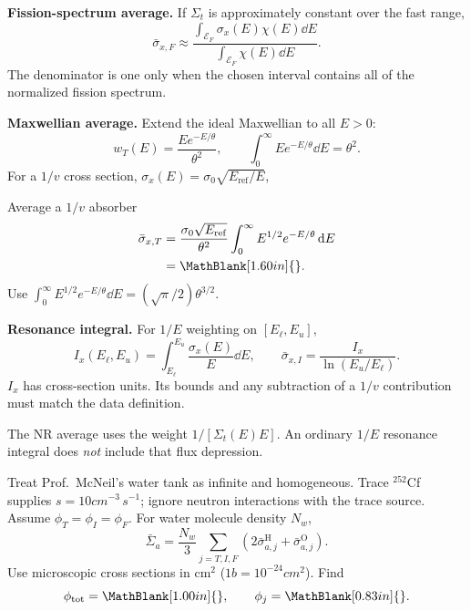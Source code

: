 \newpage
\begin{handoutcolumns}
\textbf{Fission-spectrum average.}
If $\Sigma_t$ is approximately constant over the fast range,
\[
 \bar\sigma_{x,F}\approx
 \frac{\int_{\mathcal E_F}\sigma_x(E)\chi(E)\dd E}
      {\int_{\mathcal E_F}\chi(E)\dd E}.
\]
The denominator is one only when the chosen interval contains
all of the normalized fission spectrum.

\textbf{Maxwellian average.}
Extend the ideal Maxwellian to all $E>0$:
\[
 w_T(E)=\frac{E e^{-E/\theta}}{\theta^2},
 \qquad \int_0^\infty E e^{-E/\theta}\dd E=\theta^2.
\]
For a $1/v$ cross section,
$\sigma_x(E)=\sigma_0\sqrt{E_{\mathrm{ref}}/E}$,
\begin{boardbox}{Average a $1/v$ absorber}
\begin{align*}
 \bar\sigma_{x,T}
 &=\frac{\sigma_0\sqrt{E_{\mathrm{ref}}}}{\theta^2}
   \int_0^\infty E^{1/2}e^{-E/\theta}\dd E\\
 &=\MathBlank[1.60in]{}.
\end{align*}
Use $\int_0^\infty E^{1/2}e^{-E/\theta}\dd E
=(\sqrt\pi/2)\theta^{3/2}$.
\end{boardbox}
\textbf{Resonance integral.}
For $1/E$ weighting on $[E_\ell,E_u]$,
\[
 I_x(E_\ell,E_u)=\int_{E_\ell}^{E_u}\frac{\sigma_x(E)}{E}\dd E,
 \qquad
 \boxed{\bar\sigma_{x,I}=\frac{I_x}{\ln(E_u/E_\ell)}}.
\]
$I_x$ has cross-section units. Its bounds and any subtraction
of a $1/v$ contribution must match the data definition.
\begin{takeawaybox}
The NR average uses the weight $1/[\Sigma_t(E)E]$.
An ordinary $1/E$ resonance integral does \emph{not} include
that flux depression.
\end{takeawaybox}

Treat Prof.~McNeil's water tank as infinite and homogeneous.
Trace ${}^{252}$Cf supplies $s=10\unit{cm^{-3}\,s^{-1}}$;
ignore neutron interactions with the trace source. Assume
$\phi_T=\phi_I=\phi_F$.
For water molecule density $N_w$,
\[
 \bar\Sigma_a=
 \frac{N_w}{3}\sum_{j=T,I,F}
 \left(2\bar\sigma^{\mathrm H}_{a,j}+\bar\sigma^{\mathrm O}_{a,j}\right).
\]
Use microscopic cross sections in $\mathrm{cm^2}$
($1\unit{b}=10^{-24}\unit{cm^2}$). Find
\[
 \phi_{\mathrm{tot}}=\MathBlank[1.00in]{},
 \qquad \phi_j=\MathBlank[0.83in]{}.
\]



\end{handoutcolumns}
